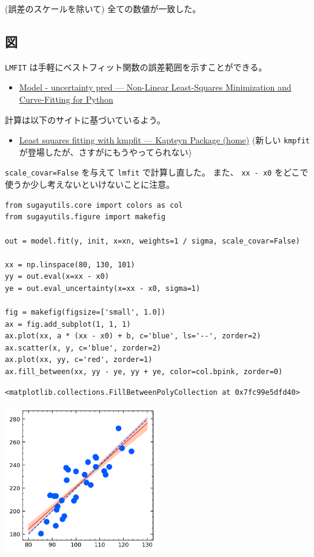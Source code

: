 \documentclass[a4paper, 9pt, notitlepage, uplatex, dvipdfmx]{jsarticle}
\begin{document}
(誤差のスケールを除いて) 全ての数値が一致した。
\subsection{図}
\label{sec:orgdb994b3}
\texttt{LMFIT} は手軽にベストフィット関数の誤差範囲を示すことができる。
\begin{itemize}
\item \href{https://lmfit.github.io/lmfit-py/examples/documentation/model\_uncertainty\_pred.html\#sphx-glr-examples-documentation-model-uncertainty-pred-py}{Model - uncertainty pred — Non-Linear Least-Squares Minimization and Curve-Fitting for Python}
\end{itemize}
計算は以下のサイトに基づいているよう。
\begin{itemize}
\item \href{https://www.astro.rug.nl/software/kapteyn/kmpfittutorial.html\#confidence-and-prediction-intervals}{Least squares fitting with kmpfit — Kapteyn Package (home)}
(新しい \texttt{kmpfit} が登場したが、さすがにもうやってられない)
\end{itemize}

\texttt{scale\_covar=False} を与えて \texttt{lmfit} で計算し直した。
また、 \texttt{xx - x0} をどこで使うか少し考えないといけないことに注意。

\begin{verbatim}
from sugayutils.core import colors as col
from sugayutils.figure import makefig

out = model.fit(y, init, x=xn, weights=1 / sigma, scale_covar=False)

xx = np.linspace(80, 130, 101)
yy = out.eval(x=xx - x0)
ye = out.eval_uncertainty(x=xx - x0, sigma=1)

fig = makefig(figsize=['small', 1.0])
ax = fig.add_subplot(1, 1, 1)
ax.plot(xx, a * (xx - x0) + b, c='blue', ls='--', zorder=2)
ax.scatter(x, y, c='blue', zorder=2)
ax.plot(xx, yy, c='red', zorder=1)
ax.fill_between(xx, yy - ye, yy + ye, color=col.bpink, zorder=0)
\end{verbatim}

\label{}
\begin{verbatim}
<matplotlib.collections.FillBetweenPolyCollection at 0x7fc99e5dfd40>
\end{verbatim}

\begin{center}
\includegraphics[width=0.5\textwidth]{./obipy-resources/fit_linear.png}
\end{center}
\end{document}

